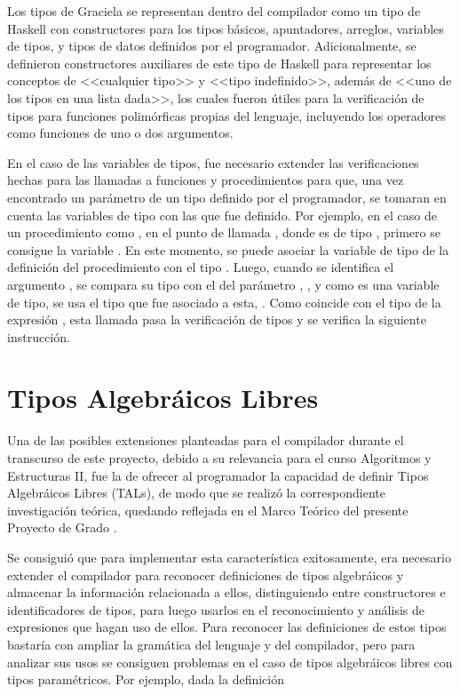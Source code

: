{{Los tipos de Graciela se representan dentro del compilador como un
tipo de Haskell con constructores para los tipos básicos, apuntadores, arreglos,
variables de tipos, y tipos de datos definidos por el programador.
Adicionalmente, se definieron constructores auxiliares de este tipo de Haskell
para representar los conceptos de <<cualquier tipo>> y <<tipo indefinido>>,
además de <<uno de los tipos en una lista dada>>, los cuales fueron útiles para
la verificación de tipos para funciones polimórficas propias del lenguaje,
incluyendo los operadores como funciones de uno o dos argumentos.

En el caso de las variables de tipos, fue necesario extender las verificaciones
hechas para las llamadas a funciones y procedimientos para que, una vez
encontrado un parámetro de un tipo definido por el programador, se tomaran en
cuenta las variables de tipo con las que fue definido. Por ejemplo, en el caso
de un procedimiento como , en el punto
de llamada , donde  es de tipo
, primero se consigue la variable . En este
momento, se puede asociar la variable de tipo  de la definición del
procedimiento  con el tipo . Luego, cuando se
identifica el argumento , se compara su tipo con el del parámetro
, , y como es una variable de tipo, se usa el tipo que fue
asociado a esta, . Como coincide con el tipo de la expresión
, esta llamada pasa la verificación de tipos y se verifica la
siguiente instrucción.

\section{Tipos Algebráicos Libres}

Una de las posibles extensiones planteadas para el compilador durante el
transcurso de este proyecto, debido a su relevancia para el curso Algoritmos y
Estructuras II, fue la de ofrecer al programador la capacidad de definir Tipos
Algebráicos Libres (TALs), de modo que se realizó la correspondiente investigación
teórica, quedando reflejada en el Marco Teórico del presente Proyecto de Grado
.

Se consiguió que para implementar esta característica exitosamente, era
necesario extender el compilador para reconocer definiciones de tipos
algebráicos y almacenar la información relacionada a ellos, distinguiendo entre
constructores e identificadores de tipos, para luego usarlos en el
reconocimiento y análisis de expresiones que hagan uso de ellos. Para reconocer
las definiciones de estos tipos bastaría con ampliar la gramática del lenguaje y
del compilador, pero para analizar sus usos se consiguen problemas en el caso de
tipos algebráicos libres con tipos paramétricos. Por ejemplo, dada la definición

}}
